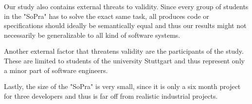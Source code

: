 Our study also contains external threats to validity. Since every group of students in the "SoPra"
has to solve the exact same task, all produces code or specifications should ideally be semantically
equal and thus our results might not necessarily be generalizable to all kind of software systems.

Another external factor that threatens validity are the participants of the study. These are limited
to students of the university Stuttgart and thus represent only a minor part of software engineers.

Lastly, the size of the "SoPra" is very small, since it is only a six month project for three developers and thus is far off from realistic industrial projects.

